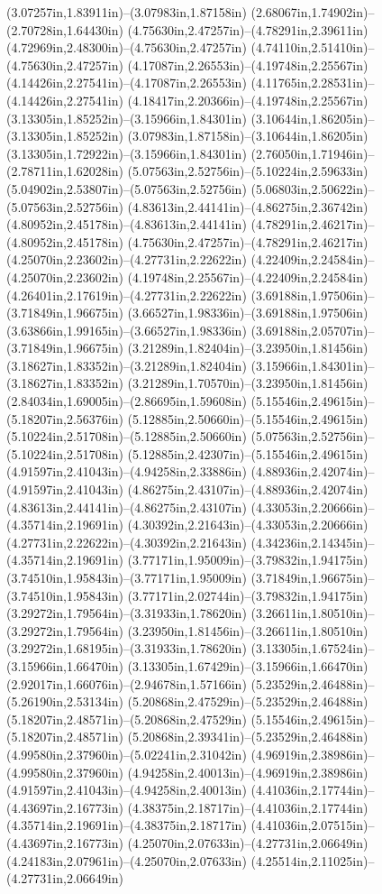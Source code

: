 (3.07257in,1.83911in)--(3.07983in,1.87158in) (2.68067in,1.74902in)--(2.70728in,1.64430in) (4.75630in,2.47257in)--(4.78291in,2.39611in) (4.72969in,2.48300in)--(4.75630in,2.47257in) (4.74110in,2.51410in)--(4.75630in,2.47257in) (4.17087in,2.26553in)--(4.19748in,2.25567in) (4.14426in,2.27541in)--(4.17087in,2.26553in) (4.11765in,2.28531in)--(4.14426in,2.27541in) (4.18417in,2.20366in)--(4.19748in,2.25567in) (3.13305in,1.85252in)--(3.15966in,1.84301in) (3.10644in,1.86205in)--(3.13305in,1.85252in) (3.07983in,1.87158in)--(3.10644in,1.86205in) (3.13305in,1.72922in)--(3.15966in,1.84301in) (2.76050in,1.71946in)--(2.78711in,1.62028in) (5.07563in,2.52756in)--(5.10224in,2.59633in) (5.04902in,2.53807in)--(5.07563in,2.52756in) (5.06803in,2.50622in)--(5.07563in,2.52756in) (4.83613in,2.44141in)--(4.86275in,2.36742in) (4.80952in,2.45178in)--(4.83613in,2.44141in) (4.78291in,2.46217in)--(4.80952in,2.45178in) (4.75630in,2.47257in)--(4.78291in,2.46217in) (4.25070in,2.23602in)--(4.27731in,2.22622in) (4.22409in,2.24584in)--(4.25070in,2.23602in) (4.19748in,2.25567in)--(4.22409in,2.24584in) (4.26401in,2.17619in)--(4.27731in,2.22622in) (3.69188in,1.97506in)--(3.71849in,1.96675in) (3.66527in,1.98336in)--(3.69188in,1.97506in) (3.63866in,1.99165in)--(3.66527in,1.98336in) (3.69188in,2.05707in)--(3.71849in,1.96675in) (3.21289in,1.82404in)--(3.23950in,1.81456in) (3.18627in,1.83352in)--(3.21289in,1.82404in) (3.15966in,1.84301in)--(3.18627in,1.83352in) (3.21289in,1.70570in)--(3.23950in,1.81456in) (2.84034in,1.69005in)--(2.86695in,1.59608in) (5.15546in,2.49615in)--(5.18207in,2.56376in) (5.12885in,2.50660in)--(5.15546in,2.49615in) (5.10224in,2.51708in)--(5.12885in,2.50660in) (5.07563in,2.52756in)--(5.10224in,2.51708in) (5.12885in,2.42307in)--(5.15546in,2.49615in) (4.91597in,2.41043in)--(4.94258in,2.33886in) (4.88936in,2.42074in)--(4.91597in,2.41043in) (4.86275in,2.43107in)--(4.88936in,2.42074in) (4.83613in,2.44141in)--(4.86275in,2.43107in) (4.33053in,2.20666in)--(4.35714in,2.19691in) (4.30392in,2.21643in)--(4.33053in,2.20666in) (4.27731in,2.22622in)--(4.30392in,2.21643in) (4.34236in,2.14345in)--(4.35714in,2.19691in) (3.77171in,1.95009in)--(3.79832in,1.94175in) (3.74510in,1.95843in)--(3.77171in,1.95009in) (3.71849in,1.96675in)--(3.74510in,1.95843in) (3.77171in,2.02744in)--(3.79832in,1.94175in) (3.29272in,1.79564in)--(3.31933in,1.78620in) (3.26611in,1.80510in)--(3.29272in,1.79564in) (3.23950in,1.81456in)--(3.26611in,1.80510in) (3.29272in,1.68195in)--(3.31933in,1.78620in) (3.13305in,1.67524in)--(3.15966in,1.66470in) (3.13305in,1.67429in)--(3.15966in,1.66470in) (2.92017in,1.66076in)--(2.94678in,1.57166in) (5.23529in,2.46488in)--(5.26190in,2.53134in) (5.20868in,2.47529in)--(5.23529in,2.46488in) (5.18207in,2.48571in)--(5.20868in,2.47529in) (5.15546in,2.49615in)--(5.18207in,2.48571in) (5.20868in,2.39341in)--(5.23529in,2.46488in) (4.99580in,2.37960in)--(5.02241in,2.31042in) (4.96919in,2.38986in)--(4.99580in,2.37960in) (4.94258in,2.40013in)--(4.96919in,2.38986in) (4.91597in,2.41043in)--(4.94258in,2.40013in) (4.41036in,2.17744in)--(4.43697in,2.16773in) (4.38375in,2.18717in)--(4.41036in,2.17744in) (4.35714in,2.19691in)--(4.38375in,2.18717in) (4.41036in,2.07515in)--(4.43697in,2.16773in) (4.25070in,2.07633in)--(4.27731in,2.06649in) (4.24183in,2.07961in)--(4.25070in,2.07633in) (4.25514in,2.11025in)--(4.27731in,2.06649in) 
